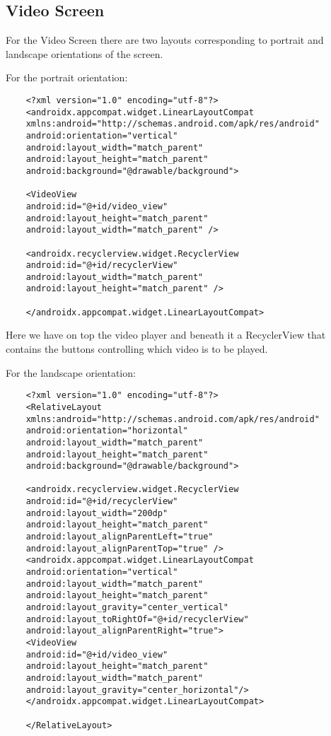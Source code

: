 \subsection {Video Screen}

For the Video Screen there are two layouts corresponding to portrait and landscape orientations of the screen.

For the portrait orientation:

\begin{lstlisting}
	<?xml version="1.0" encoding="utf-8"?>
	<androidx.appcompat.widget.LinearLayoutCompat
	xmlns:android="http://schemas.android.com/apk/res/android"
	android:orientation="vertical"
	android:layout_width="match_parent"
	android:layout_height="match_parent"
	android:background="@drawable/background">
	
	<VideoView
	android:id="@+id/video_view"
	android:layout_height="match_parent"
	android:layout_width="match_parent" />
	
	<androidx.recyclerview.widget.RecyclerView
	android:id="@+id/recyclerView"
	android:layout_width="match_parent"
	android:layout_height="match_parent" />
	
	</androidx.appcompat.widget.LinearLayoutCompat>
\end{lstlisting}

Here we have on top the video player and beneath it a RecyclerView that contains the buttons controlling which video is to be played.

For the landscape orientation:

\begin{lstlisting}
	<?xml version="1.0" encoding="utf-8"?>
	<RelativeLayout
	xmlns:android="http://schemas.android.com/apk/res/android"
	android:orientation="horizontal"
	android:layout_width="match_parent"
	android:layout_height="match_parent"
	android:background="@drawable/background">
	
	<androidx.recyclerview.widget.RecyclerView
	android:id="@+id/recyclerView"
	android:layout_width="200dp"
	android:layout_height="match_parent"
	android:layout_alignParentLeft="true"
	android:layout_alignParentTop="true" />
	<androidx.appcompat.widget.LinearLayoutCompat
	android:orientation="vertical"
	android:layout_width="match_parent"
	android:layout_height="match_parent"
	android:layout_gravity="center_vertical"
	android:layout_toRightOf="@+id/recyclerView"
	android:layout_alignParentRight="true">
	<VideoView
	android:id="@+id/video_view"
	android:layout_height="match_parent"
	android:layout_width="match_parent"
	android:layout_gravity="center_horizontal"/>
	</androidx.appcompat.widget.LinearLayoutCompat>
	
	</RelativeLayout>
\end{lstlisting}

